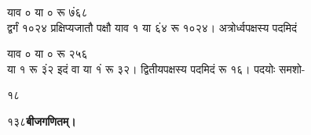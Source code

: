 \documentclass[11pt, openany]{book}
\begin{document}
\begin{sloppypar}
याव ० या ० रू ७ं६८\\

\hangindent=0.2in द्वर्गं १०२४ प्रक्षिप्यजातौ पक्षौ याव १ या ६ं४ रू १०२४। अत्रोर्ध्वपक्षस्य पदमिदं

\hspace{1.9in}याव ० या ० रू २५६\\

\hangindent=0.2in या १ रू ३ं२ इदं वा या १ं रू ३२। द्वितीयपक्षस्य पदमिदं रू १६। पदयोः समशो-

\hspace{0.5in}१८
\end{sloppypar}
\thispagestyle{empty}
\newpage

\onehalfspacing
१३८\hspace{2in}\textbf{बीजगणितम्।} 

\vspace{5mm}
\end{document}
